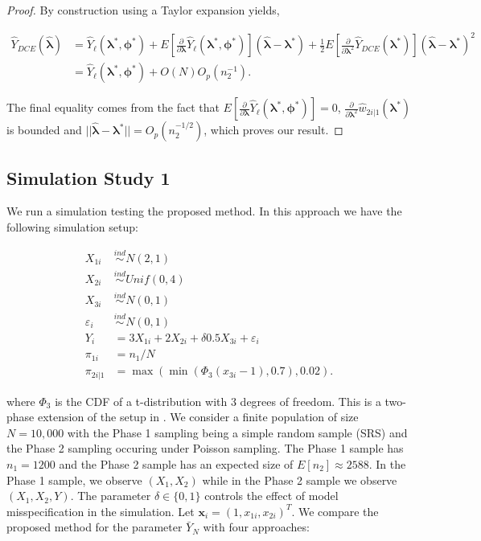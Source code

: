 \documentclass[12pt]{article}
\renewcommand{\bf}[1]{\mathbf{#1}}
\begin{document}
\begin{proof}
  By construction using a Taylor expansion yields,

  \begin{align*}
    \hat Y_{DCE}(\hat{\bm \lambda}) 
    &= \hat Y_\ell(\bm \lambda^*, \bm \phi^*) + 
    E\left[\frac{\partial}{\partial \bm \lambda}\hat Y_\ell(\bm \lambda^*,
    \bm \phi^*)\right](\hat{\bm \lambda} - \bm \lambda^*) + \frac{1}{2}
    E\left[\frac{\partial}{\partial \bm \lambda^2} \hat Y_{DCE}(\bm \lambda^*)\right] 
    (\hat{\bm \lambda} - \bm \lambda^*)^2\\
    &= \hat Y_\ell(\bm \lambda^*, \bm \phi^*) + O(N)O_p(n_2^{-1}).
  \end{align*}

  The final equality comes from the fact that 
  $E\left[\frac{\partial}{\partial \bm \lambda}
  \hat Y_\ell(\bm \lambda^*, \bm \phi^*)\right] = 0$,
  $\frac{\partial}{\partial \bm \lambda^2} \hat w_{2i|1}(\bm \lambda^*)$ is
  bounded and $||\hat{\bm \lambda} - \bm \lambda^*|| = O_p(n_2^{-1/2})$, which
  proves our result.
\end{proof}

\subsection{Simulation Study 1}

We run a simulation testing the proposed method. In this approach we have the
following simulation setup:

$$
\begin{aligned}
X_{1i} &\stackrel{ind}{\sim} N(2, 1) \\
X_{2i} &\stackrel{ind}{\sim} Unif(0, 4) \\
X_{3i} &\stackrel{ind}{\sim} N(0, 1) \\
\varepsilon_i &\stackrel{ind}{\sim} N(0, 1) \\
Y_{i} &= 3 X_{1i} + 2 X_{2i} + \delta 0.5 X_{3i} + \varepsilon_i \\
\pi_{1i} &= n_1 / N \\
\pi_{2i|1} &= \max(\min(\Phi_3(x_{3i} - 1), 0.7), 0.02).
\end{aligned}
$$

where $\Phi_3$ is the CDF of a t-distribution with 3 degrees of freedom.
This is a two-phase extension of the setup in \cite{kwon2024debiased}. We
consider a finite population of size $N = 10,000$ with the Phase 1 sampling
being a simple random sample (SRS) and the 
Phase 2 sampling occuring under Poisson sampling. The Phase 1 sample has
$n_1 = 1200$ and the Phase 2 sample has an expected size of
$E[n_2] \approx 2588$. In the Phase 1 sample, we observe 
$(X_1, X_2)$ while in the Phase 2 sample we observe $(X_1, X_2, Y)$. 
The parameter $\delta \in \{0, 1\}$ controls the effect of model misspecification
in the simulation. Let $\bf x_i = (1, x_{1i}, x_{2i})^T$. We compare the
proposed method for the parameter $\bar Y_N$ with four approaches:
\end{document}
